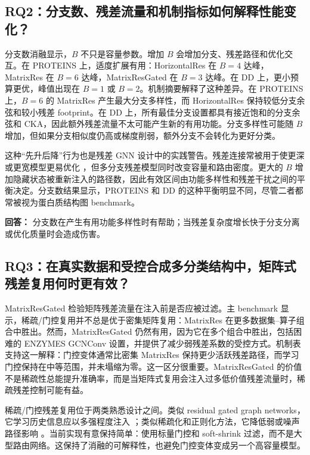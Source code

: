 \documentclass[UTF8,10pt]{ctexart}
\let\cite\citep
\begin{document}
\subsection{RQ2：分支数、残差流量和机制指标如何解释性能变化？}

分支数消融显示，\(B\) 不只是容量参数。增加 \(B\) 会增加分支、残差路径和优化交互。在 PROTEINS 上，适度扩展有用：HorizontalRes 在 \(B=4\) 达峰，MatrixRes 在 \(B=6\) 达峰，MatrixResGated 在 \(B=3\) 达峰。在 DD 上，更小预算更优，峰值出现在 \(B=1\) 或 \(B=2\)。机制摘要解释了这种差异。在 PROTEINS 上，\(B=6\) 的 MatrixRes 产生最大分支多样性，而 HorizontalRes 保持较低分支余弦和较小残差 footprint。在 DD 上，所有最佳分支设置都具有接近饱和的分支余弦和 CKA，因此额外残差流量不太可能产生新的有用功能。分支多样性可能随 \(B\) 增加，但如果分支相似度仍高或梯度削弱，额外分支不会转化为更好分类。

这种“先升后降”行为也是残差 GNN 设计中的实践警告。残差连接常被用于使更深或更宽模型更易优化 \cite{he2016deep,li2019deepgcns,li2021training}，但多分支残差模型同时改变容量和路由密度。更大的 \(B\) 增加隐藏状态被重新注入的路径数，因此有效区间由功能多样性和残差干扰之间的平衡决定。分支数结果显示，PROTEINS 和 DD 的这种平衡明显不同，尽管二者都常被视为蛋白质结构图 benchmark。

\textbf{回答：} 分支数在产生有用功能多样性时有帮助；当残差复杂度增长快于分支分离或优化质量时会造成伤害。

\subsection{RQ3：在真实数据和受控合成多分类结构中，矩阵式残差复用何时更有效？}

MatrixResGated 检验矩阵残差流量在注入前是否应被过滤。主 benchmark 显示，稀疏/门控复用并不总是优于密集矩阵复用：MatrixRes 在更多数据集--算子组合中胜出。然而，MatrixResGated 仍然有用，因为它在多个组合中胜出，包括困难的 ENZYMES GCNConv 设置，并提供了减少弱残差系数的受控方式。机制表支持这一解释：门控变体通常比密集 MatrixRes 保持更少活跃残差路径，而学习门控保持在中等范围，并未塌缩为零。这一区分很重要。MatrixResGated 的价值不是稀疏性总能提升准确率，而是当矩阵式复用会注入过多低价值残差流量时，稀疏残差控制可能有益。

稀疏/门控残差复用位于两类熟悉设计之间。类似 residual gated graph networks，它学习历史信息应以多强程度注入 \cite{bresson2017residual}；类似稀疏化和正则化方法，它降低弱或噪声路径影响 \cite{rong2019dropedge,cangea2018towards}。当前实现有意保持简单：使用标量门控和 soft-shrink 过滤，而不是大型路由网络。这保持了消融的可解释性，也避免门控变体变成另一个高容量模型。
\end{document}
